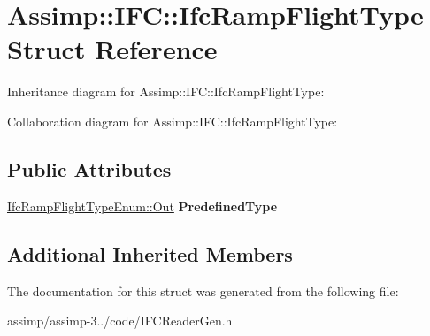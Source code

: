 \hypertarget{struct_assimp_1_1_i_f_c_1_1_ifc_ramp_flight_type}{\section{Assimp\+:\+:I\+F\+C\+:\+:Ifc\+Ramp\+Flight\+Type Struct Reference}
\label{struct_assimp_1_1_i_f_c_1_1_ifc_ramp_flight_type}
}


Inheritance diagram for Assimp\+:\+:I\+F\+C\+:\+:Ifc\+Ramp\+Flight\+Type\+:


Collaboration diagram for Assimp\+:\+:I\+F\+C\+:\+:Ifc\+Ramp\+Flight\+Type\+:
\subsection*{Public Attributes}
\begin{DoxyCompactItemize}
\item 
\hypertarget{struct_assimp_1_1_i_f_c_1_1_ifc_ramp_flight_type_a974109dfb775116a05cc0910dfe0c5c8}{\hyperlink{classboost_1_1shared__ptr}{Ifc\+Ramp\+Flight\+Type\+Enum\+::\+Out} {\bfseries Predefined\+Type}}\label{struct_assimp_1_1_i_f_c_1_1_ifc_ramp_flight_type_a974109dfb775116a05cc0910dfe0c5c8}

\end{DoxyCompactItemize}
\subsection*{Additional Inherited Members}


The documentation for this struct was generated from the following file\+:\begin{DoxyCompactItemize}
\item 
assimp/assimp-\/3../code/I\+F\+C\+Reader\+Gen.\+h\end{DoxyCompactItemize}
